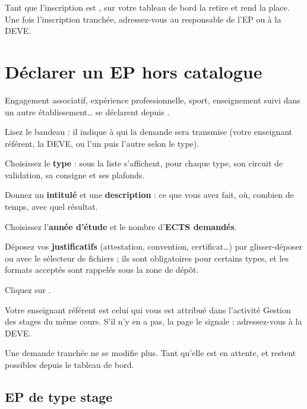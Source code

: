 \documentclass[11pt,a4paper]{article}
\begin{document}
Tant que l'inscription est ,  sur votre tableau
de bord la retire et rend la place. Une fois l'inscription tranchée, adressez-vous au
responsable de l'EP ou à la DEVE.

\section{Déclarer un EP hors catalogue}\label{sec:declarer}

Engagement associatif, expérience professionnelle, sport, enseignement suivi dans un autre
établissement\dots{} se déclarent depuis .


\begin{etapes}
  \item Lisez le bandeau : il indique à qui la demande sera transmise (votre enseignant
    référent, la DEVE, ou l'un puis l'autre selon le type).
  \item Choisissez le \textbf{type} : sous la liste s'affichent, pour chaque type, son circuit
    de validation, sa consigne et ses plafonds.
  \item Donnez un \textbf{intitulé} et une \textbf{description} : ce que vous avez fait, où,
    combien de temps, avec quel résultat.
  \item Choisissez l'\textbf{année d'étude} et le nombre d'\textbf{ECTS demandés}.
  \item Déposez vos \textbf{justificatifs} (attestation, convention, certificat\dots) par
    glisser-déposer ou avec le sélecteur de fichiers ; ils sont obligatoires pour certains
    types, et les formats acceptés sont rappelés sous la zone de dépôt.
  \item Cliquez sur .
\end{etapes}

Votre enseignant référent est celui qui vous est attribué dans l'activité \og Gestion des
stages\fg{} du même cours. S'il n'y en a pas, la page le signale : adressez-vous à la DEVE.

\begin{attention}
Une demande tranchée ne se modifie plus. Tant qu'elle est en attente,  et
 restent possibles depuis le tableau de bord.
\end{attention}

\subsection{EP de type stage}
\end{document}
